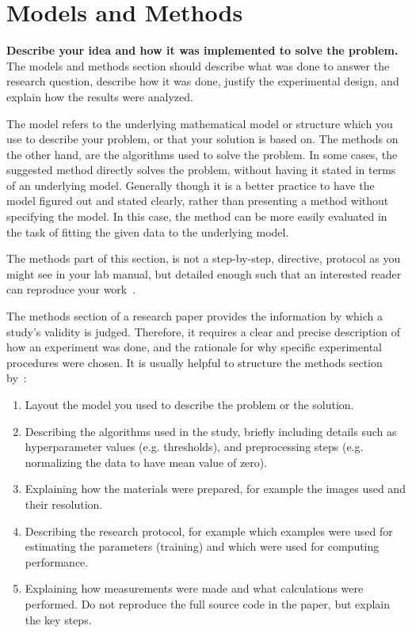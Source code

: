 \documentclass[10pt,conference,compsocconf]{IEEEtran}
\begin{document}
  

\section{Models and Methods}\label{sec:models-methods}
\textbf{ Describe your idea and how it was implemented to solve
  the problem.}
The models and methods
section should describe what was
done to answer the research question, describe how it was done,
justify the experimental design, and
explain how the results were analyzed.

The model refers to the underlying mathematical model or structure which 
you use to describe your problem, or that your solution is based on. 
The methods on the other hand, are the algorithms used to solve the problem. 
In some cases, the suggested method directly solves the problem, without having it 
stated in terms of an underlying model. Generally though it is a better practice to have 
the model figured out and stated clearly, rather than presenting a method without specifying 
the model. In this case, the method can be more easily evaluated in the task of fitting 
the given data to the underlying model.

The methods part of this section, is not a step-by-step, directive,
protocol as you might see in your lab manual, but detailed enough such
that an interested reader can reproduce your
work~\cite{anderson04,wavelab}.

The methods section of a research paper provides the information by
which a study's validity is judged.
Therefore, it requires a clear and precise description of how an
experiment was done, and the rationale
for why specific experimental procedures were chosen.
It is usually helpful to
structure the methods section by~\cite{kallet04methods}:
\begin{enumerate}
\item Layout the model you used to describe the problem or the solution.
\item Describing the algorithms used in the study, briefly including
  details such as hyperparameter values (e.g. thresholds), and
  preprocessing steps (e.g. normalizing the data to have mean value of
  zero).
\item Explaining how the materials were prepared, for example the
  images used and their resolution.
\item Describing the research protocol, for example which examples
  were used for estimating the parameters (training) and which were
  used for computing performance.
\item Explaining how measurements were made and what
  calculations were performed. Do not reproduce the full source code in
  the paper, but explain the key steps.
\end{enumerate}
 
\end{document}
